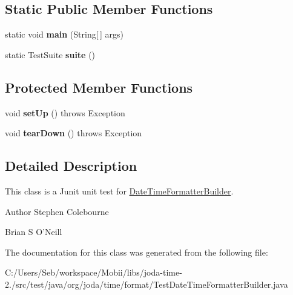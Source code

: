 \subsection*{Static Public Member Functions}
\begin{DoxyCompactItemize}
\item 
\hypertarget{classorg_1_1joda_1_1time_1_1format_1_1_test_date_time_formatter_builder_a40c7c1120acc65d13f2658b4b803f55c}{static void {\bfseries main} (String\mbox{[}$\,$\mbox{]} args)}\label{classorg_1_1joda_1_1time_1_1format_1_1_test_date_time_formatter_builder_a40c7c1120acc65d13f2658b4b803f55c}

\item 
\hypertarget{classorg_1_1joda_1_1time_1_1format_1_1_test_date_time_formatter_builder_a4ba0d5d4a3651bf5a5e8236d0ed2ab46}{static Test\-Suite {\bfseries suite} ()}\label{classorg_1_1joda_1_1time_1_1format_1_1_test_date_time_formatter_builder_a4ba0d5d4a3651bf5a5e8236d0ed2ab46}

\end{DoxyCompactItemize}
\subsection*{Protected Member Functions}
\begin{DoxyCompactItemize}
\item 
\hypertarget{classorg_1_1joda_1_1time_1_1format_1_1_test_date_time_formatter_builder_ad3420ce16f9f6152fa6d84dc716e299e}{void {\bfseries set\-Up} ()  throws Exception }\label{classorg_1_1joda_1_1time_1_1format_1_1_test_date_time_formatter_builder_ad3420ce16f9f6152fa6d84dc716e299e}

\item 
\hypertarget{classorg_1_1joda_1_1time_1_1format_1_1_test_date_time_formatter_builder_a3076f74b9a894953287f0ed628188b71}{void {\bfseries tear\-Down} ()  throws Exception }\label{classorg_1_1joda_1_1time_1_1format_1_1_test_date_time_formatter_builder_a3076f74b9a894953287f0ed628188b71}

\end{DoxyCompactItemize}


\subsection{Detailed Description}
This class is a Junit unit test for \hyperlink{classorg_1_1joda_1_1time_1_1format_1_1_date_time_formatter_builder}{Date\-Time\-Formatter\-Builder}.

\begin{DoxyAuthor}{Author}
Stephen Colebourne 

Brian S O'Neill 
\end{DoxyAuthor}


The documentation for this class was generated from the following file\-:\begin{DoxyCompactItemize}
\item 
C\-:/\-Users/\-Seb/workspace/\-Mobii/libs/joda-\/time-\/2./src/test/java/org/joda/time/format/Test\-Date\-Time\-Formatter\-Builder.\-java\end{DoxyCompactItemize}
